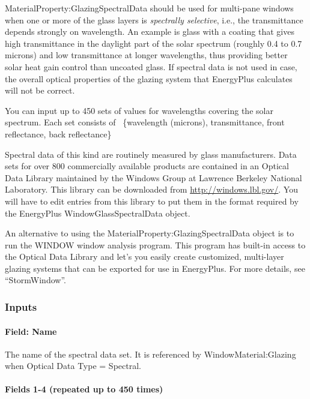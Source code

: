 MaterialProperty:GlazingSpectralData should be used for multi-pane windows when one or more of the glass layers is \emph{spectrally selective}, i.e., the transmittance depends strongly on wavelength. An example is glass with a coating that gives high transmittance in the daylight part of the solar spectrum (roughly 0.4 to 0.7 microns) and low transmittance at longer wavelengths, thus providing better solar heat gain control than uncoated glass. If spectral data is not used in case, the overall optical properties of the glazing system that EnergyPlus calculates will not be correct.

You can input up to 450 sets of values for wavelengths covering the solar spectrum. Each set consists of~ \{wavelength (microns), transmittance, front reflectance, back reflectance\}

Spectral data of this kind are routinely measured by glass manufacturers. Data sets for over 800 commercially available products are contained in an Optical Data Library maintained by the Windows Group at Lawrence Berkeley National Laboratory. This library can be downloaded from \url{http://windows.lbl.gov/}. You will have to edit entries from this library to put them in the format required by the EnergyPlus WindowGlassSpectralData object.

An alternative to using the MaterialProperty:GlazingSpectralData object is to run the WINDOW window analysis program. This program has built-in access to the Optical Data Library and let's you easily create customized, multi-layer glazing systems that can be exported for use in EnergyPlus. For more details, see ``StormWindow''.

\subsubsection{Inputs}\label{inputs-33-000}

\paragraph{Field: Name}\label{field-name-27-002}

The name of the spectral data set. It is referenced by WindowMaterial:Glazing when Optical Data Type = Spectral.

\paragraph{Fields 1-4 (repeated up to 450 times)}\label{fields-1-4-repeated-up-to-450-times}

